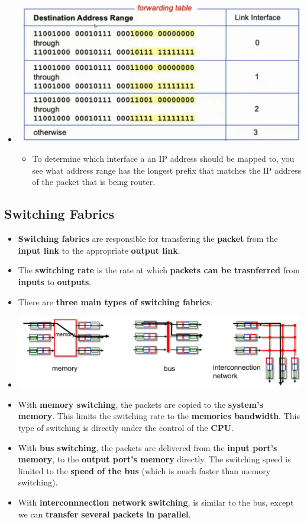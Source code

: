 \documentclass{article}
\begin{document}
\begin{itemize}
        \item[] \includegraphics[width=\textwidth - 25pt]{images/Forward-Table.png}
        \begin{itemize}
            \item To determine which interface a an IP address should be mapped to, you see what address range has the longest prefix that matches the IP address of the packet that is being router.
        \end{itemize} 
    \end{itemize}

    \subsection*{Switching Fabrics}
    \begin{itemize}
        \item \textbf{Switching fabrics} are responsible for transfering the \textbf{packet} from the \textbf{input link} to the appropriate \textbf{output link}.
        \item The \textbf{switching rate} is the rate at which \textbf{packets can be trasnferred} from \textbf{inputs} to \textbf{outputs}.
        \item There are \textbf{three main types of switching fabrics}:
        \item[] \includegraphics[width=\textwidth - 25pt]{images/Switching-Fabrics.png}
        \item With \textbf{memory switching}, the packets are copied to the \textbf{system's memory}. This limits the switching rate to the \textbf{memories bandwidth}. This type of switching is directly under the control of the \textbf{CPU}.
        \item With \textbf{bus switching}, the packets are delivered from the \textbf{input port's memory}, to the \textbf{output port's memory} directly. The switching speed is limited to the \textbf{speed of the bus} (which is much faster than memory switching). 
        \item With \textbf{interconnnection network switching}, is similar to the bus, except we can \textbf{transfer several packets in parallel}.
    \end{itemize}
\end{document}
